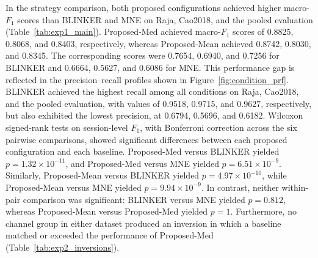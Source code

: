 In the strategy comparison, both proposed configurations achieved higher macro-$F_1$ scores than BLINKER and MNE on Raja, Cao2018, and the pooled evaluation (Table~\ref{tab:exp1_main}). Proposed-Med achieved macro-$F_1$ scores of 0.8825, 0.8068, and 0.8403, respectively, whereas Proposed-Mean achieved 0.8742, 0.8030, and 0.8345. The corresponding scores were 0.7654, 0.6940, and 0.7256 for BLINKER and 0.6664, 0.5627, and 0.6086 for MNE. This performance gap is reflected in the precision--recall profiles shown in Figure~\ref{fig:condition_prf}. BLINKER achieved the highest recall among all conditions on Raja, Cao2018, and the pooled evaluation, with values of 0.9518, 0.9715, and 0.9627, respectively, but also exhibited the lowest precision, at 0.6794, 0.5696, and 0.6182. Wilcoxon signed-rank tests on session-level $F_1$, with Bonferroni correction across the six pairwise comparisons, showed significant differences between each proposed configuration and each baseline. Proposed-Med versus BLINKER yielded $p=1.32\times10^{-11}$, and Proposed-Med versus MNE yielded $p=6.51\times10^{-9}$. Similarly, Proposed-Mean versus BLINKER yielded $p=4.97\times10^{-10}$, while Proposed-Mean versus MNE yielded $p=9.94\times10^{-9}$. In contrast, neither within-pair comparison was significant: BLINKER versus MNE yielded $p=0.812$, whereas Proposed-Mean versus Proposed-Med yielded $p=1$. Furthermore, no channel group in either dataset produced an inversion in which a baseline matched or exceeded the performance of Proposed-Med (Table~\ref{tab:exp2_inversions}).
